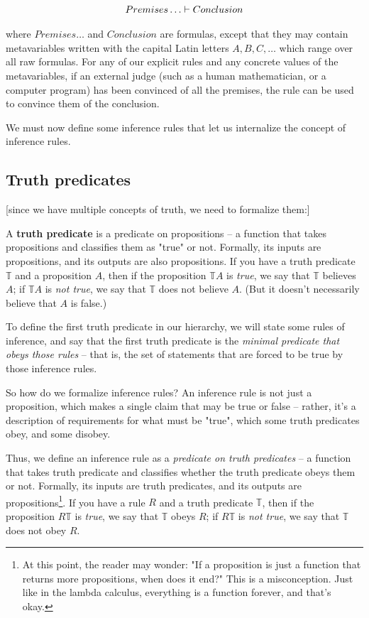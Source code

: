 \documentclass{article}
\begin{document}
  \begin{align*}
    Premises\dots &\vdash Conclusion\\
  \end{align*}
  
  where $Premises\dots$ and $Conclusion$ are formulas, except that they may contain metavariables written with the capital Latin letters $A, B, C, \dots$ which range over all raw formulas. For any of our explicit rules and any concrete values of the metavariables, if an external judge (such as a human mathematician, or a computer program) has been convinced of all the premises, the rule can be used to convince them of the conclusion.
  
  We must now define some inference rules that let us internalize the concept of inference rules.


  \iffalse

  \subsection{Truth predicates}
  
  [since we have multiple concepts of truth, we need to formalize them:]
  
  A \textbf{truth predicate} is a predicate on propositions – a function that takes propositions and classifies them as "true" or not. Formally, its inputs are propositions, and its outputs are also propositions. If you have a truth predicate $\mathbb{T}$ and a proposition $A$, then if the proposition $\mathbb{T} A$ is \emph{true}, we say that $\mathbb{T}$ believes $A$; if $\mathbb{T} A$ is \emph{not true}, we say that $\mathbb{T}$ does not believe $A$. (But it doesn't necessarily believe that $A$ is false.)
  
  To define the first truth predicate in our hierarchy, we will state some rules of inference, and say that the first truth predicate is the \emph{minimal predicate that obeys those rules} – that is, the set of statements that are forced to be true by those inference rules.
  
  So how do we formalize inference rules? An inference rule is not just a proposition, which makes a single claim that may be true or false – rather, it's a description of requirements for what must be "true", which some truth predicates obey, and some disobey.
    
  Thus, we define an inference rule as a \emph{predicate on truth predicates} – a function that takes truth predicate and classifies whether the truth predicate obeys them or not. Formally, its inputs are truth predicates, and its outputs are propositions\footnote{At this point, the reader may wonder: "If a proposition is just a function that returns more propositions, when does it end?" This is a misconception. Just like in the lambda calculus, everything is a function forever, and that's okay.}. If you have a rule $R$ and a truth predicate $\mathbb{T}$, then if the proposition $R \mathbb{T}$ is \emph{true}, we say that $\mathbb{T}$ obeys $R$; if $R \mathbb{T}$ is \emph{not true}, we say that $\mathbb{T}$ does not obey $R$.
  
\end{document}

